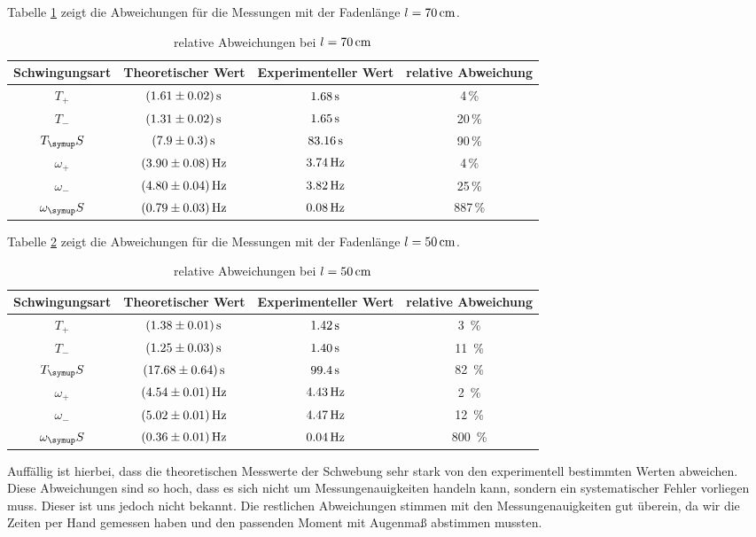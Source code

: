 Tabelle \ref{tab:rel70} zeigt die Abweichungen für die Messungen mit der
Fadenlänge $l=70\,\si{\centi\meter}$.
\begin{table}
  \begin{tabular}{c | c c | c}
    \toprule
    Schwingungsart & Theoretischer Wert & Experimenteller Wert &
    relative Abweichung \\
    \midrule
    $T_+$  & $(1.61\pm0.02)\,\si{\second}$ & $1.68\,\si{\second}$ & 4\,\si{\percent} \\
    $T_-$  & $(1.31\pm0.02)\,\si{\second}$ & $1.65\,\si{\second}$ & 20\,\si{\percent} \\
    $T_\su{S}$ & $(7.9\pm0.3)\,\si{\second}$ &  $83.16\,\si{\second}$ & 90\,\si{\percent} \\
    $\omega_+$ & $(3.90\pm0.08)\,\si{\hertz}$ & $3.74\,\si{\hertz}$ & 4\,\si{\percent} \\
    $\omega_-$ & $(4.80\pm0.04)\,\si{\hertz}$ & $3.82\,\si{\hertz}$ & 25\,\si{\percent} \\
    $\omega_\su{S}$ & $(0.79\pm0.03)\,\si{\hertz}$ & $0.08\,\si{\hertz}$ & 887\,\si{\percent} \\
    \bottomrule
  \end{tabular}
  \caption{relative Abweichungen bei $l=70\,\si{\centi\meter}$}
  \label{tab:rel70}
\end{table}
Tabelle \ref{tab:rel50} zeigt die Abweichungen für die Messungen mit der
Fadenlänge $l=50\,\si{\centi\meter}$.
\begin{table}
  \begin{tabular}{c | c c | c}
    \toprule
    Schwingungsart & Theoretischer Wert & Experimenteller Wert &
    relative Abweichung \\
    \midrule
    $T_+$&$(1.38\pm0.01)\,\si{\second}$ & $1.42\,\si{\second}$ & 3 \,\si{\percent} \\
    $T_-$&$(1.25\pm0.03)\,\si{\second}$ & $1.40\,\si{\second}$ & 11 \,\si{\percent} \\
    $T_\su{S}$&$(17.68\pm0.64)\,\si{\second}$ & $99.4\,\si{\second}$ & 82 \,\si{\percent} \\
    $\omega_+$ & $(4.54\pm0.01)\,\si{\hertz}$ & $4.43\,\si{\hertz}$ & 2 \,\si{\percent} \\
    $\omega_-$ & $(5.02\pm0.01)\,\si{\hertz}$ & $4.47\,\si{\hertz}$ & 12 \,\si{\percent} \\
    $\omega_\su{S}$ & $(0.36\pm0.01)\,\si{\hertz}$ & $0.04\,\si{\hertz}$ & 800 \,\si{\percent} \\
    \bottomrule
  \end{tabular}
  \caption{relative Abweichungen bei $l=50\,\si{\centi\meter}$}
  \label{tab:rel50}
\end{table}
Auffällig ist hierbei, dass die theoretischen Messwerte der Schwebung sehr
stark von den experimentell bestimmten Werten abweichen. Diese Abweichungen sind
so hoch, dass es sich nicht um Messungenauigkeiten handeln kann, sondern ein
systematischer Fehler vorliegen muss. Dieser ist uns jedoch nicht bekannt.
Die restlichen Abweichungen stimmen mit den Messungenauigkeiten gut überein,
da wir die Zeiten per Hand gemessen haben und den passenden Moment mit
Augenmaß abstimmen mussten.
